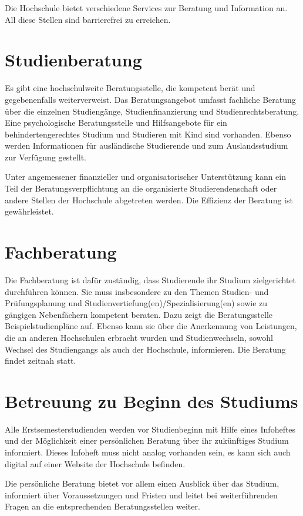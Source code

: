 Die Hochschule bietet verschiedene Services zur Beratung und Information an. All diese Stellen sind barrierefrei zu erreichen.

\section{Studienberatung}

Es gibt eine hochschulweite Beratungsstelle, die kompetent berät und gegebenenfalls weiterverweist. Das Beratungsangebot umfasst fachliche Beratung über die einzelnen Studiengänge, Studienfinanzierung und Studienrechtsberatung. Eine psychologische Beratungsstelle und Hilfsangebote für ein behindertengerechtes Studium und Studieren mit Kind sind vorhanden. Ebenso werden Informationen für ausländische Studierende und zum Auslandsstudium zur Verfügung gestellt.

Unter angemessener finanzieller und organisatorischer Unterstützung kann ein Teil der Beratungsverpflichtung an die organisierte Studierendenschaft oder andere Stellen der Hochschule abgetreten werden. Die Effizienz der Beratung ist gewährleistet.

\section{Fachberatung}

Die Fachberatung ist dafür zuständig, dass Studierende ihr Studium zielgerichtet durchführen können. Sie muss insbesondere zu den Themen Studien- und Prüfungsplanung und Studienvertiefung(en)/Spezialisierung(en) sowie zu gängigen Nebenfächern kompetent beraten. Dazu zeigt die Beratungsstelle Beispielstudienpläne auf. Ebenso kann sie über die Anerkennung von Leistungen, die an anderen Hochschulen erbracht wurden und Studienwechseln, sowohl Wechsel des Studiengangs als auch der Hochschule, informieren. Die Beratung findet zeitnah statt.

\section{Betreuung zu Beginn des Studiums}

Alle Erstsemesterstudienden werden vor Studienbeginn mit Hilfe eines Infoheftes und der Möglichkeit einer persönlichen Beratung über ihr zukünftiges Studium informiert. Dieses Infoheft muss nicht analog vorhanden sein, es kann sich auch digital auf einer Website der Hochschule befinden.

Die persönliche Beratung bietet vor allem einen Ausblick über das Studium, informiert über Voraussetzungen und Fristen und leitet bei weiterführenden Fragen an die entsprechenden Beratungsstellen weiter.

